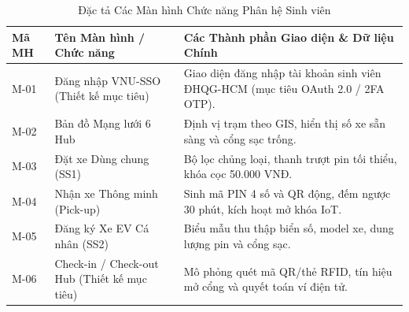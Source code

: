 \documentclass[12pt,a4paper]{article}
\begin{document}
\begin{table}[H]
    \centering
    \small
    \renewcommand{\arraystretch}{1.2}
    \caption{Đặc tả Các Màn hình Chức năng Phân hệ Sinh viên}
    \label{tab:ui-student-screens}
    \begin{tabularx}{\textwidth}{|l|l|X|}
        \hline
        \textbf{Mã MH} & \textbf{Tên Màn hình / Chức năng} & \textbf{Các Thành phần Giao diện \& Dữ liệu Chính} \\
        \hline
        M-01 & Đăng nhập VNU-SSO (Thiết kế mục tiêu) & Giao diện đăng nhập tài khoản sinh viên ĐHQG-HCM (mục tiêu OAuth 2.0 / 2FA OTP). \\
        \hline
        M-02 & Bản đồ Mạng lưới 6 Hub & Định vị trạm theo GIS, hiển thị số xe sẵn sàng và cổng sạc trống. \\
        \hline
        M-03 & Đặt xe Dùng chung (SS1) & Bộ lọc chủng loại, thanh trượt pin tối thiểu, khóa cọc 50.000 VNĐ. \\
        \hline
        M-04 & Nhận xe Thông minh (Pick-up) & Sinh mã PIN 4 số và QR động, đếm ngược 30 phút, kích hoạt mở khóa IoT. \\
        \hline
        M-05 & Đăng ký Xe EV Cá nhân (SS2) & Biểu mẫu thu thập biển số, model xe, dung lượng pin và cổng sạc. \\
        \hline
        M-06 & Check-in / Check-out Hub (Thiết kế mục tiêu) & Mô phỏng quét mã QR/thẻ RFID, tín hiệu mở cổng và quyết toán ví điện tử. \\
        \hline
    \end{tabularx}
\end{table}

\clearpage
\end{document}
